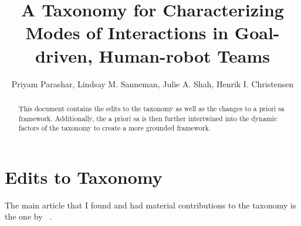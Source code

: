 \documentclass[letterpaper, 10 pt, conference]{ieeeconf}  %
\title{\LARGE \bf
A Taxonomy for Characterizing Modes of Interactions in Goal-driven, Human-robot Teams
}
\author{
Priyam Parashar, Lindsay M. Sanneman, Julie A. Shah, Henrik I. Christensen
}
\theoremstyle{definition}
\newcommand{\citet}[1]{\citeauthor{#1}~\cite{#1}}
\begin{document}
\maketitle
\thispagestyle{empty}
\pagestyle{empty}


\begin{abstract}

This document contains the edits to the taxonomy as well as the changes to a priori sa framework. Additionally, the a priori sa is then further intertwined into the dynamic factors of the taxonomy to create a more grounded framework.

\end{abstract}



\section{Edits to Taxonomy}

The main article that I found and had material contributions to the taxonomy is the one by \citet{moya2007towards}.
\end{document}
